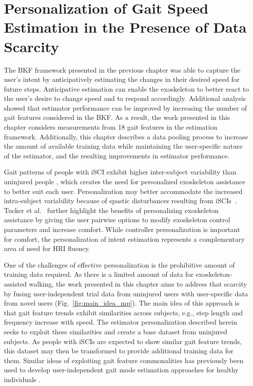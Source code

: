 \chapter{Personalization of Gait Speed Estimation in the Presence of Data Scarcity}\label{chapter:MP}

The BKF framework presented in the previous chapter was able to capture the user’s intent by anticipatively estimating the changes in their desired speed for future steps. Anticipative estimation can enable the exoskeleton to better react to the user's desire to change speed and to respond accordingly. Additional analysis showed that estimator performance can be improved by increasing the number of gait features considered in the BKF. As a result, the work presented in this chapter considers measurements from 18 gait features in the estimation framework. Additionally, this chapter describes a data pooling process to increase the amount of available training data while maintaining the user-specific nature of the estimator, and the resulting improvements in estimator performance. 

Gait patterns of people with iSCI exhibit higher inter-subject variability than uninjured people \cite{sohn2018variability}, which creates the need for personalized exoskeleton assistance to better suit each user. Personalization may better accommodate the increased intra-subject variability because of spastic disturbances resulting from iSCIs~\cite{krawetz1996gait}. Tucker et al.~\cite{tucker2020preference} further highlight the benefits of personalizing exoskeleton assistance by giving the user pairwise options to modify exoskeleton control parameters and increase comfort. While controller personalization is important for comfort, the personalization of intent estimation represents a complementary area of need for HRI fluency.

One of the challenges of effective personalization is the prohibitive amount of training data required. As there is a limited amount of data for exoskeleton-assisted walking, the work presented in this chapter aims to address that scarcity by fusing user-independent trial data from uninjured users with user-specific data from novel users (Fig.~\ref{fig:main_idea_mp}).
The main idea of this approach is that gait feature trends exhibit similarities across subjects, e.g., step length and frequency increase with speed. The estimator personalization described herein seeks to exploit these similarities and create a base dataset from uninjured subjects. As people with iSCIs are expected to show similar gait feature trends, this dataset may then be transformed to provide additional training data for them. Similar ideas of exploiting gait feature commonalities has previously been used to develop user-independent gait mode estimation approaches for healthy individuals \cite{kilmartin2009optimising,ibrahim2008gait}. 

